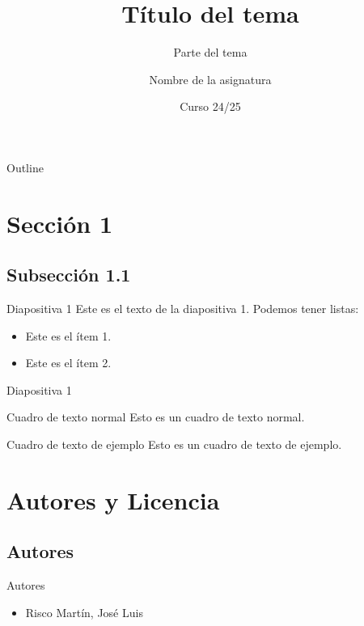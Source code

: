 \documentclass[8pt, t]{beamer}
\author{Nombre de la asignatura}
\date{Curso 24/25}
\title{Título del tema}
\subtitle{Parte del tema}
\begin{document}
\maketitle
\begin{frame}{Outline}
\tableofcontents
\end{frame}


\section{Sección 1}
\label{sec:orgcd089b0}

\subsection{Subsección 1.1}
\label{sec:orge2da144}

\begin{frame}[label={sec:orgb765f9b}]{Diapositiva 1}
Este es el \alert{texto de la diapositiva 1}. Podemos tener listas:
\begin{itemize}
\item Este es el ítem 1.
\item Este es el ítem 2.
\end{itemize}
\end{frame}

\begin{frame}[label={sec:org7eae34f}]{Diapositiva 1}
\begin{block}{Cuadro de texto normal}
Esto es un cuadro de texto normal.
\end{block}

\begin{exampleblock}{Cuadro de texto de ejemplo}
Esto es un cuadro de texto de ejemplo.
\end{exampleblock}
\end{frame}

\section{Autores y Licencia}
\label{sec:org1d807ec}

\subsection{Autores}
\label{sec:org5b0a56e}

\begin{frame}[label={sec:orgcefb417}]{Autores}
\begin{itemize}
\item Risco Martín, José Luis
\end{itemize}
\end{frame}
\end{document}
